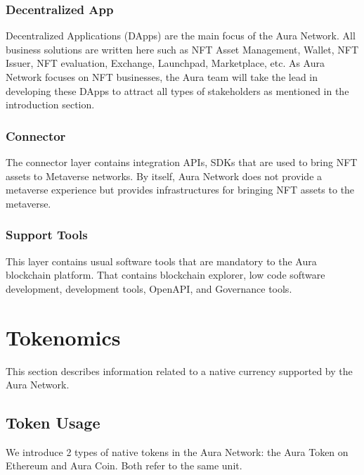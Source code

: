 \documentclass[12pt]{article}
\begin{document}
\subsubsection*{Decentralized App}
Decentralized Applications (DApps) are the main focus of the Aura Network. All business solutions are written here such as NFT Asset Management, Wallet, NFT Issuer, NFT evaluation, Exchange, Launchpad, Marketplace, etc. As Aura Network focuses on NFT businesses, the Aura team will take the lead in developing these DApps to attract all types of stakeholders as mentioned in the introduction section.

\subsubsection*{Connector}
The connector layer contains integration APIs, SDKs that are used to bring NFT assets to Metaverse networks. By itself, Aura Network does not provide a metaverse experience but provides infrastructures for bringing NFT assets to the metaverse.

\subsubsection*{Support Tools}
This layer contains usual software tools that are mandatory to the Aura blockchain platform. That contains blockchain explorer, low code software development, development tools, OpenAPI, and Governance tools.

\section{Tokenomics}

This section describes information related to a native currency supported by the Aura Network.

\subsection{Token Usage}
We introduce 2 types of native tokens in the Aura Network: the Aura Token on Ethereum and Aura Coin. Both refer to the same unit.
\end{document}
